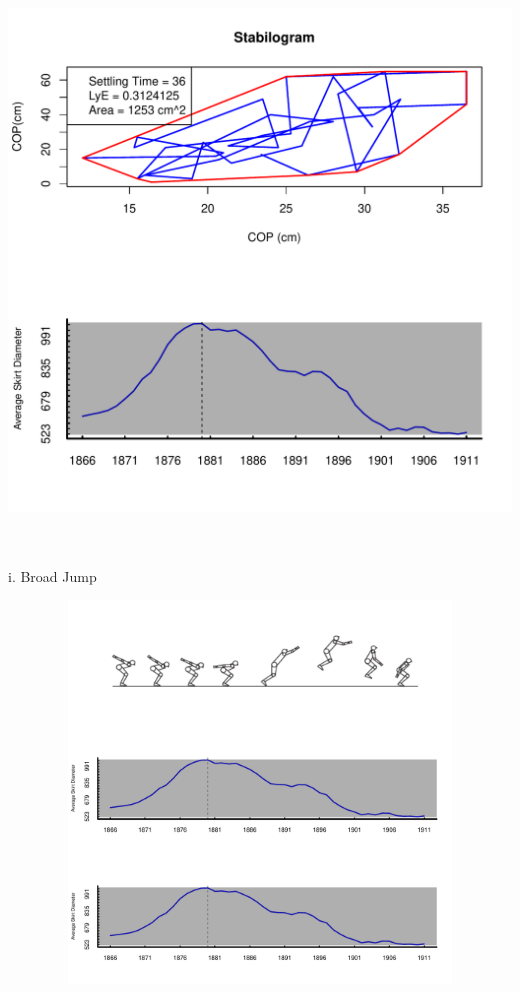 \documentclass{article}\usepackage[]{graphicx}\usepackage[]{color}
\newenvironment{knitrout}{}{} %
\begin{document}
\begin{knitrout}
\color{fgcolor}

\includegraphics[width=6in,height=6in]{figure/latex-unnamed-chunk-11-1} \hfill{}



\end{knitrout}

i. Broad Jump
\begin{knitrout}
\color{fgcolor}

\includegraphics[width=6in,height=4in]{figure/latex-unnamed-chunk-12-1} \hfill{}



\end{knitrout}
\end{document}
